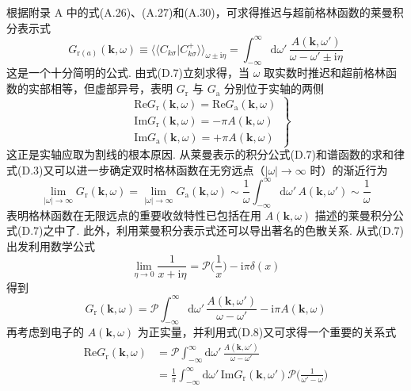 根据附录 A 中的式(A.26)、(A.27)和(A.30)，可求得推迟与超前格林函数的莱曼积分表示式
\begin{equation}
G_{\mathrm{r}(a)}(\boldsymbol{k},\omega)
\equiv\langle\langle C_{k\sigma}|C_{k\sigma}^{+}\rangle\rangle_{\omega\pm\mathrm{i}\eta}
=\int_{-\infty}^{\infty}\mathrm{d}\omega'\,
\frac{A(\boldsymbol{k},\omega')}{\omega-\omega'\pm\mathrm{i}\eta}
\end{equation}
这是一个十分简明的公式. 由式(D.7)立刻求得，当 $\omega$ 取实数时推迟和超前格林函数的实部相等，但虚部异号，表明 $G_{\mathrm{r}}$ 与 $G_{\mathrm{a}}$ 分别位于实轴的两侧
\begin{equation}
\left.
\begin{aligned}
&\mathrm{Re}G_{\mathrm{r}}(\boldsymbol{k},\omega)
=\mathrm{Re}G_{\mathrm{a}}(\boldsymbol{k},\omega)\\
&\mathrm{Im}G_{\mathrm{r}}(\boldsymbol{k},\omega)
=-\pi A(\boldsymbol{k},\omega)\\
&\mathrm{Im}G_{\mathrm{a}}(\boldsymbol{k},\omega)
=+\pi A(\boldsymbol{k},\omega)
\end{aligned}
\right\}
\end{equation}
这正是实轴应取为割线的根本原因. 从莱曼表示的积分公式(D.7)和谱函数的求和律式(D.3)又可以进一步确定双时格林函数在无穷远点（$|\omega|\to\infty$ 时）的渐近行为
\begin{equation}
\lim_{|\omega|\to\infty}G_{\mathrm{r}}(\boldsymbol{k},\omega)
=\lim_{|\omega|\to\infty}G_{\mathrm{a}}(\boldsymbol{k},\omega)
\sim\frac{1}{\omega}\int_{-\infty}^{\infty}
\mathrm{d}\omega'\,A(\boldsymbol{k},\omega')\sim\frac{1}{\omega}
\end{equation}
表明格林函数在无限远点的重要收敛特性已包括在用 $A(\boldsymbol{k},\omega)$ 描述的莱曼积分公式(D.7)之中了. 此外，利用莱曼积分表示式还可以导出著名的色散关系. 从式(D.7)出发利用数学公式
\begin{equation}
\lim_{\eta\to 0}\frac{1}{x+\mathrm{i}\eta}
=\mathcal{P}\biggl(\frac{1}{x}\biggr)-\mathrm{i}\pi\delta(x)
\end{equation}
得到
\begin{equation}
G_{\mathrm{r}}(\boldsymbol{k},\omega)=\mathcal{P}
\int_{-\infty}^{\infty}\mathrm{d}\omega'\,
\frac{A(\boldsymbol{k},\omega')}{\omega-\omega'}
-\mathrm{i}\pi A(\boldsymbol{k},\omega)
\end{equation}
再考虑到电子的 $A(\boldsymbol{k},\omega)$ 为正实量，并利用式(D.8)又可求得一个重要的关系式
\begin{equation}
\begin{aligned}
\mathrm{Re}G_{\mathrm{r}}(\boldsymbol{k},\omega)
&=\mathcal{P}\int_{-\infty}^{\infty}\mathrm{d}\omega'\,
\frac{A(\boldsymbol{k},\omega')}{\omega-\omega'}\\
&=\frac{1}{\pi}\int_{-\infty}^{\infty}\mathrm{d}\omega'\,
\mathrm{Im}G_{\mathrm{r}}(\boldsymbol{k},\omega')
\mathcal{P}\biggl(\frac{1}{\omega'-\omega}\biggr)
\end{aligned}
\end{equation}
